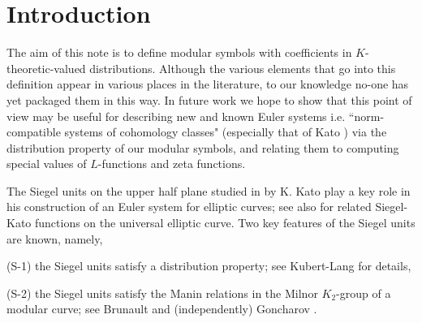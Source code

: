 \documentclass[12pt,amstex,amssymb]{article}
\theoremstyle{plain}
\theoremstyle{definition}
\def\C{{\mathbb C}}
\def\Q{{\mathbb Q}}
\def\Sym{\text{Sym}}
\newcommand{\GL}{\operatorname{GL}}
\begin{document}
\tableofcontents










\section{Introduction}


The aim of this note is to 
define modular symbols with coefficients in $K$-theoretic-valued distributions.  Although the various elements that go into this definition appear in various places in the literature, to our knowledge no-one has yet packaged them in this way.  
In future work we hope to show  that this point of view may be useful for describing new and known Euler systems i.e. ``norm-compatible systems of cohomology classes" 
(especially that of Kato \cite{Kat}) via the distribution property of our modular symbols, and relating them to computing special values of $L$-functions and zeta functions.

The Siegel units on the upper half plane studied in \cite{Kat} by K. Kato play a key role in his construction of an Euler system for elliptic curves; see also \cite{Sch} for related Siegel-Kato functions on the universal elliptic curve.
Two key features of the Siegel units are known, namely,

(S-1) the Siegel units satisfy a  distribution property; see Kubert-Lang \cite{KubertLang} for details,

(S-2) the Siegel units satisfy the Manin relations in the Milnor $K_2$-group of a modular curve; %
see Brunault \cite{Bru} and (independently) Goncharov \cite{Gon}.
\end{document}
